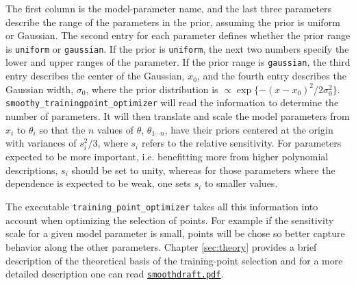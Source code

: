 \documentclass[UserManual.tex]{subfiles}
\begin{document}
\begin{sloppypar}
{{\begin{Verbatim}[commandchars=\\\{\}]
\end{Verbatim}
}\vspace*{-8pt}
}
The first column is the model-parameter name, and the last three parameters describe the range of the parameters in the prior, assuming the prior is uniform or Gaussian. The second entry for each parameter defines whether the prior range is {\tt uniform} or {\tt gaussian}. If the prior is {\tt uniform}, the next two numbers specify the lower and upper ranges of the parameter. If the prior range is {\tt gaussian}, the third entry describes the center of the Gaussian, $x_0$, and the fourth entry describes the Gaussian width, $\sigma_0$, where the prior distribution is $\propto \exp\{-(x-x_0)^2/2\sigma_0^2\}$. {\tt smoothy\_trainingpoint\_optimizer} will read the information to determine the number of parameters. It will then translate and scale the model parameters from $x_i$ to $\theta_i$ so that the $n$ values of $\theta$, $\theta_{1\cdots n}$, have their priors centered at the origin with variances of $s_i^2/3$, where $s_i$ refers to the relative sensitivity. For parameters expected to be more important, i.e. benefitting more from higher polynomial descriptions, $s_i$ should be set to unity, whereas for those parameters where the dependence is expected to be weak, one sets $s_i$ to smaller values. 

The executable {\tt training\_point\_optimizer} takes all this information into account when optimizing the selection of points. For example if the sensitivity scale for a given model parameter is small, points will be chose so better capture behavior along the other parameters. Chapter \ref{sec:theory} provides a brief description of the theoretical basis of the training-point selection and for a more detailed description one can read \href{./smoothdraft.pdf}{{\tt smoothdraft.pdf}}.


\end{sloppypar}
\end{document}

